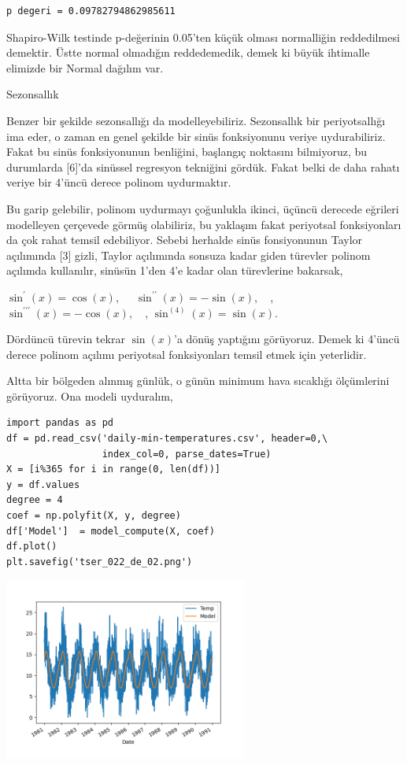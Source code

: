 \documentclass[12pt,fleqn]{article}\usepackage{../../common}
\begin{document}
\begin{verbatim}
p degeri = 0.09782794862985611
\end{verbatim}

Shapiro-Wilk testinde p-değerinin 0.05'ten küçük olması normalliğin reddedilmesi
demektir. Üstte normal olmadığın reddedemedik, demek ki büyük ihtimalle elimizde
bir Normal dağılım var.

Sezonsallık

Benzer bir şekilde sezonsallığı da modelleyebiliriz. Sezonsallık bir
periyotsallığı ima eder, o zaman en genel şekilde bir sinüs fonksiyonunu veriye
uydurabiliriz. Fakat bu sinüs fonksiyonunun benliğini, başlangıç noktasını
bilmiyoruz, bu durumlarda [6]'da sinüssel regresyon tekniğini gördük. Fakat
belki de daha rahatı veriye bir 4'üncü derece polinom uydurmaktır.

Bu garip gelebilir, polinom uydurmayı çoğunlukla ikinci, üçüncü derecede
eğrileri modelleyen çerçevede görmüş olabiliriz, bu yaklaşım fakat periyotsal
fonksiyonları da çok rahat temsil edebiliyor. Sebebi herhalde sinüs fonsiyonunun
Taylor açılımında [3] gizli, Taylor açılımında sonsuza kadar giden türevler
polinom açılımda kullanılır, sinüsün 1'den 4'e kadar olan türevlerine bakarsak,

$\sin^{\prime}(x)=\cos(x),\quad$
$\sin^{\prime\prime}(x)=-\sin(x),\quad$,
$\sin^{\prime\prime\prime}(x)=-\cos(x),\quad$,
$\sin^{(4)}(x)=\sin(x)$.

Dördüncü türevin tekrar $\sin(x)$'a dönüş yaptığını görüyoruz. Demek ki 4'üncü
derece polinom açılımı periyotsal fonksiyonları temsil etmek için yeterlidir.

Altta bir bölgeden alınmış günlük, o günün minimum hava sıcaklığı ölçümlerini
görüyoruz. Ona modeli uyduralım,

\begin{verbatim}
import pandas as pd
df = pd.read_csv('daily-min-temperatures.csv', header=0,\
                 index_col=0, parse_dates=True)
X = [i%365 for i in range(0, len(df))]
y = df.values
degree = 4
coef = np.polyfit(X, y, degree)
df['Model']  = model_compute(X, coef)
df.plot()
plt.savefig('tser_022_de_02.png')
\end{verbatim}

\includegraphics[height=6cm]{tser_022_de_02.png}
\end{document}
